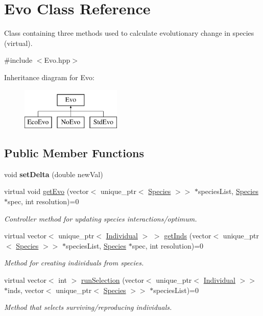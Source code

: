 \hypertarget{classEvo}{}\section{Evo Class Reference}
\label{classEvo}


Class containing three methods used to calculate evolutionary change in species (virtual).  




{\ttfamily \#include $<$Evo.\+hpp$>$}

Inheritance diagram for Evo\+:\begin{figure}[H]
\begin{center}
\leavevmode
\includegraphics[height=2.000000cm]{classEvo}
\end{center}
\end{figure}
\subsection*{Public Member Functions}
\begin{DoxyCompactItemize}
\item 
\hypertarget{classEvo_adae2722f000f4838bae9743979b50328}{}\label{classEvo_adae2722f000f4838bae9743979b50328} 
void {\bfseries set\+Delta} (double new\+Val)
\item 
virtual void \hyperlink{classEvo_a8c5208c00d1ee2fe9bef41bdd7fe0ab7}{get\+Evo} (vector$<$ unique\+\_\+ptr$<$ \hyperlink{classSpecies}{Species} $>$$>$ $\ast$species\+List, \hyperlink{classSpecies}{Species} $\ast$spec, int resolution)=0
\begin{DoxyCompactList}\small\item\em Controller method for updating species interactions/optimum. \end{DoxyCompactList}\item 
virtual vector$<$ unique\+\_\+ptr$<$ \hyperlink{classIndividual}{Individual} $>$ $>$ \hyperlink{classEvo_a88b5e0b1053cf1b4b473a08e2f03db92}{get\+Inds} (vector$<$ unique\+\_\+ptr$<$ \hyperlink{classSpecies}{Species} $>$$>$ $\ast$species\+List, \hyperlink{classSpecies}{Species} $\ast$spec, int resolution)=0
\begin{DoxyCompactList}\small\item\em Method for creating individuals from species. \end{DoxyCompactList}\item 
virtual vector$<$ int $>$ \hyperlink{classEvo_a10ff4eefe3967ff5cf5f820890c18079}{run\+Selection} (vector$<$ unique\+\_\+ptr$<$ \hyperlink{classIndividual}{Individual} $>$$>$ $\ast$inds, vector$<$ unique\+\_\+ptr$<$ \hyperlink{classSpecies}{Species} $>$$>$ $\ast$species\+List)=0
\begin{DoxyCompactList}\small\item\em Method that selects surviving/reproducing individuals. \end{DoxyCompactList}\end{DoxyCompactItemize}
